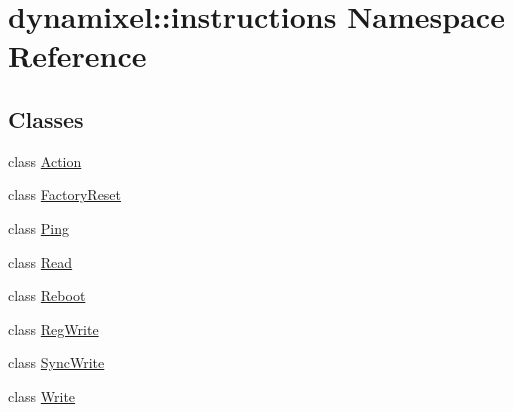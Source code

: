 \hypertarget{namespacedynamixel_1_1instructions}{}\section{dynamixel\+:\+:instructions Namespace Reference}
\label{namespacedynamixel_1_1instructions}
\subsection*{Classes}
\begin{DoxyCompactItemize}
\item 
class \hyperlink{classdynamixel_1_1instructions_1_1_action}{Action}
\item 
class \hyperlink{classdynamixel_1_1instructions_1_1_factory_reset}{Factory\+Reset}
\item 
class \hyperlink{classdynamixel_1_1instructions_1_1_ping}{Ping}
\item 
class \hyperlink{classdynamixel_1_1instructions_1_1_read}{Read}
\item 
class \hyperlink{classdynamixel_1_1instructions_1_1_reboot}{Reboot}
\item 
class \hyperlink{classdynamixel_1_1instructions_1_1_reg_write}{Reg\+Write}
\item 
class \hyperlink{classdynamixel_1_1instructions_1_1_sync_write}{Sync\+Write}
\item 
class \hyperlink{classdynamixel_1_1instructions_1_1_write}{Write}
\end{DoxyCompactItemize}
